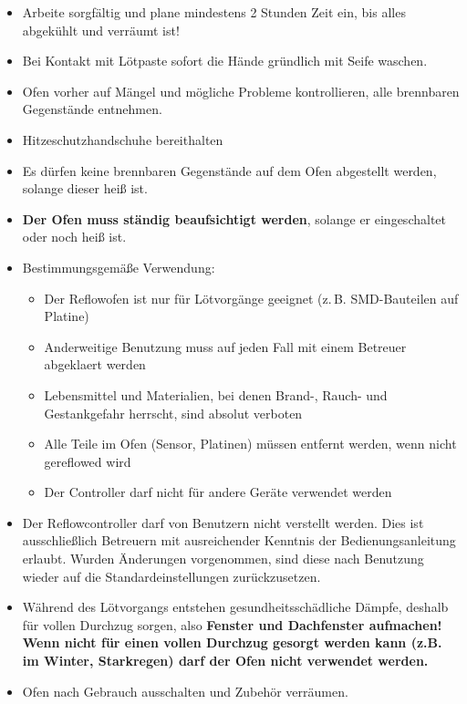 \documentclass[fontsize=11pt]{scrartcl}
\begin{document}
\begin{itemize}
	\item Arbeite sorgfältig und plane mindestens 2 Stunden Zeit ein, bis alles abgekühlt und verräumt ist!
	\item Bei Kontakt mit Lötpaste sofort die Hände gründlich mit Seife waschen.
	\item Ofen vorher auf Mängel und mögliche Probleme kontrollieren, alle brennbaren Gegenstände entnehmen.
	\item Hitzeschutzhandschuhe bereithalten
	\item Es dürfen keine brennbaren Gegenstände auf dem Ofen abgestellt werden, solange dieser heiß ist.
	\item \textbf{Der Ofen muss ständig beaufsichtigt werden}, solange er eingeschaltet oder noch heiß ist.
	\item Bestimmungsgemäße Verwendung:

\begin{itemize}
	\setlength{\itemsep}{-3pt}
	\item Der Reflowofen ist nur für Lötvorgänge geeignet (z.\,B. SMD-Bauteilen auf Platine)
	\item Anderweitige Benutzung muss auf jeden Fall mit einem Betreuer abgeklaert werden
	\item Lebensmittel und Materialien, bei denen Brand-, Rauch- und Gestankgefahr herrscht, sind absolut verboten
	\item Alle Teile im Ofen (Sensor, Platinen) müssen entfernt werden, wenn nicht gereflowed wird
	\item Der Controller darf nicht für andere Geräte verwendet werden
\end{itemize}
	\item Der Reflowcontroller darf von Benutzern nicht verstellt werden. Dies ist ausschließlich Betreuern mit ausreichender Kenntnis der Bedienungsanleitung erlaubt. Wurden Änderungen vorgenommen, sind diese nach Benutzung wieder auf die Standardeinstellungen zurückzusetzen.
	\item Während des Lötvorgangs entstehen gesundheitsschädliche Dämpfe, deshalb für vollen Durchzug sorgen, also \textbf{Fenster und Dachfenster aufmachen! Wenn nicht für einen vollen Durchzug gesorgt werden kann (z.B. im Winter, Starkregen) darf der Ofen nicht verwendet werden.}
	\item Ofen nach Gebrauch ausschalten und Zubehör verräumen.
\end{itemize}
\end{document}
